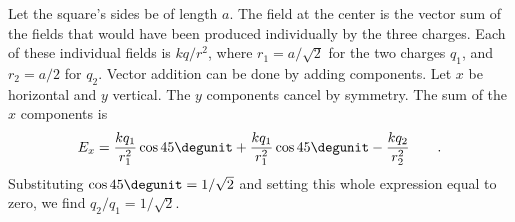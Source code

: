  Let the square's sides be of length $a$. The field at
the center is the vector sum of the fields that would have
been produced individually by the three charges. Each of
these individual fields is $kq/r^2$, where $r_1=a/\sqrt{2}$ for
the two charges $q_1$, and $r_2=a/2$ for $q_2$. Vector
addition can be done by adding components. Let $x$ be
horizontal and $y$ vertical. The $y$ components cancel by
symmetry. The sum of the $x$ components is
\begin{equation*}
		E_x	 =    \frac{kq_1}{r_1^2}\cos  45\degunit + \frac{kq_1}{r_1^2}\cos  45\degunit  - \frac{kq_2}{r_2^2} \qquad .
\end{equation*}
Substituting $\cos 45\degunit=1/\sqrt{2}$ and setting this whole
expression equal to zero, we find $q_2/q_1=1/\sqrt{2}$.



